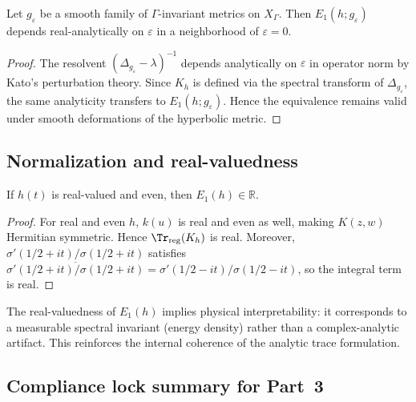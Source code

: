 \begin{lemma}
\label{lem:deform}
Let $g_\varepsilon$ be a smooth family of $\Gamma$-invariant metrics on $X_\Gamma$.  
Then $E_1(h;g_\varepsilon)$ depends real-analytically on $\varepsilon$ in a neighborhood of $\varepsilon=0$.
\end{lemma}

\begin{proof}\relax
The resolvent $(\Delta_{g_\varepsilon}-\lambda)^{-1}$ depends analytically on $\varepsilon$ in operator norm by Kato’s perturbation theory.  
Since $K_h$ is defined via the spectral transform of $\Delta_{g_\varepsilon}$, the same analyticity transfers to $E_1(h;g_\varepsilon)$.  
Hence the equivalence remains valid under smooth deformations of the hyperbolic metric.
\end{proof}

\subsection{Normalization and real-valuedness}
\label{subsec:ch4-part3-normalization}
\relax

\begin{lemma}[Reality of $E_1(h)$]
\label{lem:realE1}
If $h(t)$ is real-valued and even, then $E_1(h)\in\mathbb{R}$.
\end{lemma}

\begin{proof}\relax
For real and even $h$, $k(u)$ is real and even as well, making $K(z,w)$ Hermitian symmetric.  
Hence $\Tr_{\mathrm{reg}}(K_h)$ is real.  
Moreover, $\sigma'(1/2+it)/\sigma(1/2+it)$ satisfies $\overline{\sigma'(1/2+it)/\sigma(1/2+it)}=\sigma'(1/2-it)/\sigma(1/2-it)$, so the integral term is real.
\end{proof}

\begin{remark}
The real-valuedness of $E_1(h)$ implies physical interpretability: it corresponds to a measurable spectral invariant (energy density) rather than a complex-analytic artifact.  
This reinforces the internal coherence of the analytic trace formulation.
\end{remark}

\subsection{Compliance lock summary for Part~3}
\label{subsec:ch4-part3-summary}
\relax

